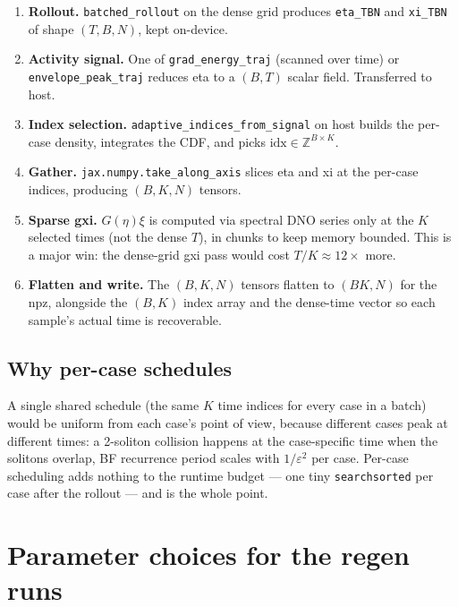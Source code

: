 \documentclass[11pt]{article}
\begin{document}
\begin{enumerate}
  \item \textbf{Rollout.} \texttt{batched\_rollout} on the dense grid produces
  \texttt{eta\_TBN} and \texttt{xi\_TBN} of shape $(T, B, N)$, kept on-device.

  \item \textbf{Activity signal.} One of \texttt{grad\_energy\_traj} (scanned
  over time) or \texttt{envelope\_peak\_traj} reduces eta to a $(B, T)$ scalar
  field. Transferred to host.

  \item \textbf{Index selection.} \texttt{adaptive\_indices\_from\_signal} on
  host builds the per-case density, integrates the CDF, and picks
  $\mathrm{idx} \in \mathbb{Z}^{B \times K}$.

  \item \textbf{Gather.} \texttt{jax.numpy.take\_along\_axis} slices eta and xi
  at the per-case indices, producing $(B, K, N)$ tensors.

  \item \textbf{Sparse gxi.} $G(\eta)\xi$ is computed via spectral DNO series
  only at the $K$ selected times (not the dense $T$), in chunks to keep memory
  bounded. This is a major win: the dense-grid gxi pass would cost $T / K
  \approx 12\times$ more.

  \item \textbf{Flatten and write.} The $(B, K, N)$ tensors flatten to
  $(BK, N)$ for the npz, alongside the $(B, K)$ index array and the dense-time
  vector so each sample's actual time is recoverable.
\end{enumerate}

\subsection{Why per-case schedules}

A single shared schedule (the same $K$ time indices for every case in a batch)
would be uniform from each case's point of view, because different cases peak
at different times: a 2-soliton collision happens at the case-specific time
when the solitons overlap, BF recurrence period scales with $1/\varepsilon^2$
per case. Per-case scheduling adds nothing to the runtime budget --- one tiny
\texttt{searchsorted} per case after the rollout --- and is the whole point.

\section{Parameter choices for the regen runs}
\end{document}
